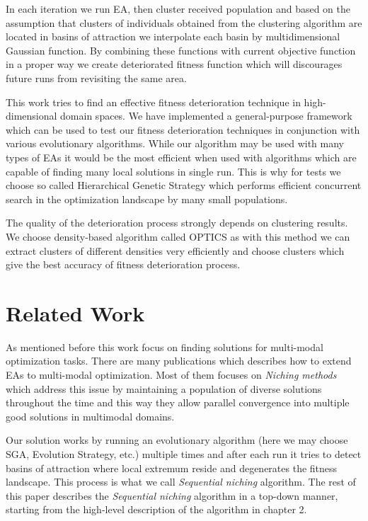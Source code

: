 In each iteration we run EA, then cluster received population and
based on the assumption that clusters of individuals obtained from
the clustering algorithm are located in basins of attraction we interpolate
 each basin by multidimensional Gaussian function. By combining
these functions with current objective function in a proper way we
create deteriorated fitness function which will discourages future runs
from revisiting the same area.

This work tries to find an effective fitness deterioration technique in
high-dimensional domain spaces. We have implemented a general-purpose framework which can be
used to test our fitness deterioration techniques in conjunction with
various evolutionary algorithms. While our algorithm may be used with many types
of EAs it would be the most efficient when used with algorithms which are capable 
of finding many local solutions in single run. This is why for tests
we choose so called Hierarchical Genetic Strategy which performs efficient
concurrent search in the optimization landscape by many small populations.

The quality of the deterioration process strongly depends on clustering results.
We choose density-based algorithm called OPTICS as with this method we can extract clusters of
different densities very efficiently and choose clusters which give the
best accuracy of fitness deterioration process.

\section{Related Work}

As mentioned before this work focus on finding solutions for multi-modal
optimization tasks. There are many publications which describes how to extend
EAs to multi-modal optimization. Most of them focuses on 
\textit{Niching methods} \cite{niching,sharing,dynsharing} which address this
issue by maintaining a population of diverse solutions throughout the time and this way they allow
parallel convergence into multiple good solutions in multimodal domains.

Our solution works by running an evolutionary algorithm (here we may choose
SGA, Evolution Strategy, etc.) multiple times and after each run it tries
to detect basins of attraction where local extremum reside and 
degenerates the fitness landscape. This process is what we call
\textit{Sequential niching} algorithm. The rest of this paper describes 
the \textit{Sequential niching} algorithm in a top-down manner, starting
from the high-level description of the algorithm in chapter 2.   

